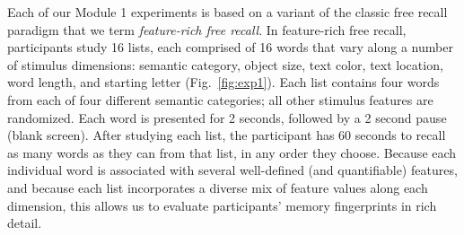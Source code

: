 Each of our Module 1 experiments is based on a variant of the classic free
recall paradigm that we term \textit{feature-rich free recall}. In feature-rich
free recall, participants study 16 lists, each comprised of 16 words that vary
along a number of stimulus dimensions: semantic category, object size, text
color, text location, word length, and starting letter (Fig.~\ref{fig:exp1}).
Each list contains four words from each of four different semantic categories;
all other stimulus features are randomized. Each word is presented for 2
seconds, followed by a 2 second pause (blank screen). After studying each list,
the participant has 60 seconds to recall as many words as they can from that
list, in any order they choose. Because each individual word is associated with
several well-defined (and quantifiable) features, and because each list
incorporates a diverse mix of feature values along each dimension, this allows
us to evaluate participants' memory fingerprints in rich detail.

